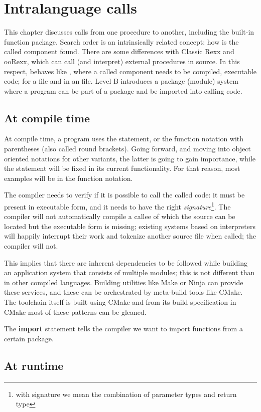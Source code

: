 \chapter{Intralanguage calls}
This chapter discusses calls from one \crexx{} procedure to another,
including the built-in function package. Search order is an
intrinsically related concept: how is the called component found. There
are some differences with Classic Rexx and ooRexx, which can call (and interpret)
external procedures in source. In this respect, \crexx{} behaves like
\nr{}, where a called component needs to be compiled, executable
code; for \nr{} a  file and in \crexx{} an 
file. Level B introduces a package (module) system where a program can
be part of a package and be imported into calling code.
\section{At compile time}
At compile time, a program uses the  statement, or the
function notation with parentheses (also called round brackets). Going
forward, and moving into object oriented notations for other \rexx{}
variants, the latter is going to gain importance, while the
 statement will be fixed in its current functionality. For
that reason, most examples will be in the function notation.

The compiler needs to verify if it is possible to call the called
code: it must be present in executable form, and it needs to have the right
\emph{signature}\footnote{with signature we mean the combination of
  parameter types and return type}. The compiler will not automatically compile a callee
of which the source can be located but the executable form is missing;
existing systems based on interpreters will happily interrupt their
work and tokenize another source file when called; the \crexx{}
 compiler will not.

This implies that there are inherent dependencies to be followed
while building an application system that consists of multiple
modules; this is not different than in other compiled
languages. Building utilities like Make or Ninja can provide these
services, and these can be orchestrated by meta-build tools like
CMake. The \crexx{} toolchain itself is built using CMake and from its
build specification in CMake most of these patterns can be gleaned.

The \textbf{import} statement\label{intraImport} tells the compiler we want to
import functions from a certain package.


\section{At runtime}

